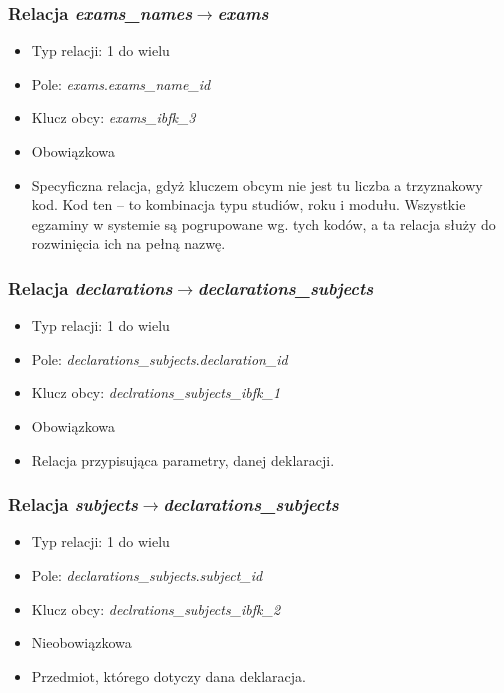 \documentclass[a4paper,12pt,oneside]{report}
\begin{document}
\subsubsection{Relacja \emph{exams\_names}$\to$\emph{exams}}
\label{subsub:exams_names-exams}
\begin{itemize}
  \item Typ relacji: 1 do wielu
  \item Pole: \emph{exams}.\emph{exams\_name\_id}
  \item Klucz obcy: \emph{exams\_ibfk\_3}
  \item Obowiązkowa
  \item Specyficzna relacja, gdyż kluczem obcym nie jest tu liczba a trzyznakowy kod. Kod ten -- to kombinacja typu studiów, roku i modułu. Wszystkie egzaminy w systemie są pogrupowane wg. tych kodów, a ta relacja służy do rozwinięcia ich na pełną nazwę.
\end{itemize}

\subsubsection{Relacja \emph{declarations}$\to$\emph{declarations\_subjects}}
\label{subsub:declarations-declarations_subjects}
\begin{itemize}
  \item Typ relacji: 1 do wielu
  \item Pole: \emph{declarations\_subjects}.\emph{declaration\_id}
  \item Klucz obcy: \emph{declrations\_subjects\_ibfk\_1}
  \item Obowiązkowa
  \item Relacja przypisująca parametry, danej deklaracji.
\end{itemize}

\subsubsection{Relacja \emph{subjects}$\to$\emph{declarations\_subjects}}
\label{subsub:subjects-declarations_subjects}
\begin{itemize}
  \item Typ relacji: 1 do wielu
  \item Pole: \emph{declarations\_subjects}.\emph{subject\_id}
  \item Klucz obcy: \emph{declrations\_subjects\_ibfk\_2}
  \item Nieobowiązkowa
  \item Przedmiot, którego dotyczy dana deklaracja.
\end{itemize}
\end{document}
